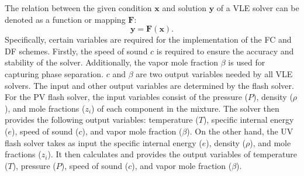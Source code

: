 The relation between the given condition $\boldsymbol{x}$ and solution $\boldsymbol{y}$ of a VLE solver can be denoted as a function or mapping $\boldsymbol{F}$:
$$\boldsymbol{y=F\left(x\right)}.$$
Specifically, certain variables are required for the implementation of the FC and DF schemes. Firstly, the speed of sound $c$ is required to ensure the accuracy and stability of the solver. Additionally, the vapor mole fraction $\beta$ is used for capturing phase separation. $c$ and $\beta$ are two output variables needed by all VLE solvers. The input and other output variables are determined by the flash solver. For the PV flash solver, the input variables consist of the pressure ($P$), density ($\rho$), and mole fractions ($z_i$) of each component in the mixture. The solver then provides the following output variables: temperature ($T$), specific internal energy ($e$), speed of sound ($c$), and vapor mole fraction ($\beta$).
On the other hand, the UV flash solver takes as input the specific internal energy ($e$), density ($\rho$), and mole fractions ($z_i$). It then calculates and provides the output variables of temperature ($T$), pressure ($P$), speed of sound ($c$), and vapor mole fraction ($\beta$).


